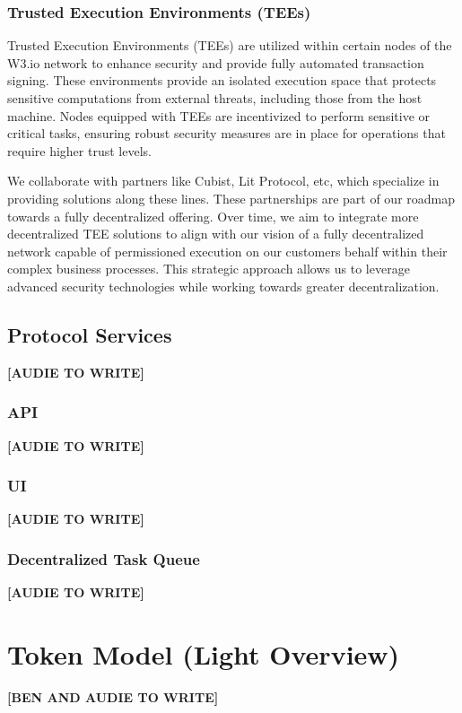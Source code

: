 \documentclass[11pt]{article}
\newcommand{\needs}[1]{\textbf{\color{red}[\MakeUppercase{#1}]}}
\begin{document}
\subsubsection{Trusted Execution Environments (TEEs)}
Trusted Execution Environments (TEEs) are utilized within certain nodes of the W3.io network to enhance security and provide fully automated transaction signing. These environments provide an isolated execution space that protects sensitive computations from external threats, including those from the host machine. Nodes equipped with TEEs are incentivized to perform sensitive or critical tasks, ensuring robust security measures are in place for operations that require higher trust levels.

We collaborate with partners like Cubist, Lit Protocol, etc, which specialize in providing solutions along these lines. These partnerships are part of our roadmap towards a fully decentralized offering. Over time, we aim to integrate more decentralized TEE solutions to align with our vision of a fully decentralized network capable of permissioned execution on our customers behalf within their complex business processes. This strategic approach allows us to leverage advanced security technologies while working towards greater decentralization.

\subsection{Protocol Services}

\needs{Audie to write}

\subsubsection{API}

\needs{Audie to write}

\subsubsection{UI}
\needs{Audie to write}

\subsubsection{Decentralized Task Queue}
\needs{Audie to write}

\section{Token Model (Light Overview)}
\needs{BEN AND AUDIE TO WRITE} 
\end{document}
